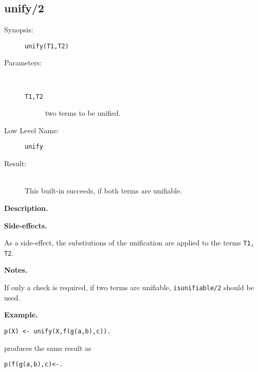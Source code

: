 %
%
%
\subsection{unify/2}

\begin{description}
\item[Synopsis:]
	{\tt unify(T1,T2)}
\item[Parameters:]\ \\[-0.5cm]
	\begin{description}
	\item[{\tt T1,T2}]
two terms to be unified.
	\end{description}
\item[Low Level Name:]
	{\tt unify}
\item[Result:]\ \\
This built-in succeeds, if both terms are unifiable.
\end{description}

\vspace*{0.5cm}
\noindent
{\bf Description.}

\vspace*{0.5cm}
\noindent
{\bf Side-effects.}

As a side-effect, the substiutions of the unification are applied to
the terms {\tt T1, T2}.
 
\vspace*{0.5cm}
\noindent
{\bf Notes.}

If only a check is required, if two terms are unifiable, {\tt isunifiable/2}
should be used.



\vspace*{0.5cm}
\noindent
{\bf Example.}

\begin{verbatim}
p(X) <- unify(X,f(g(a,b),c)).
\end{verbatim}
 
produces the same result as
\begin{verbatim}
p(f(g(a,b),c)<-.
\end{verbatim}
 

